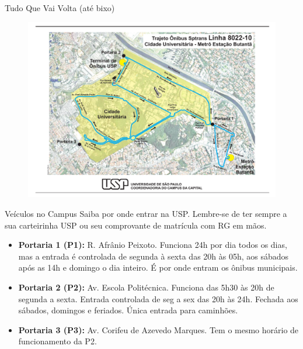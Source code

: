 \begin{secao}{Tudo Que Vai Volta (até bixo)}
\begin{figure}[H]
  \begin{center}
    \includegraphics[height=\textwidth, angle=90]{img/8022-10.pdf}
  \end{center}
\end{figure}


\begin{subsecao}{Veículos no Campus}
Saiba por onde entrar na USP. Lembre-se de ter sempre a sua carteirinha USP ou
seu comprovante de matrícula com RG em mãos. 
\begin{itemize}
  \item {\bf Portaria 1 (P1):} R. Afrânio Peixoto. Funciona 24h por dia todos os
    dias, mas a entrada é controlada de segunda à sexta das 20h às 05h, aos sábados
    após as 14h e domingo o dia inteiro. É por onde entram os ônibus municipais. 
    
  \item {\bf Portaria 2 (P2):} Av. Escola Politécnica. Funciona das 5h30 às 20h
    de segunda a sexta. Entrada controlada de seg a sex das 20h às 24h. Fechada
    aos sábados, domingos e feriados. Única entrada para caminhões. 
    
  \item {\bf Portaria 3 (P3):} Av. Corifeu de Azevedo Marques. Tem o mesmo horário
    de funcionamento da P2.


\end{itemize}
\end{subsecao}
\end{secao}

